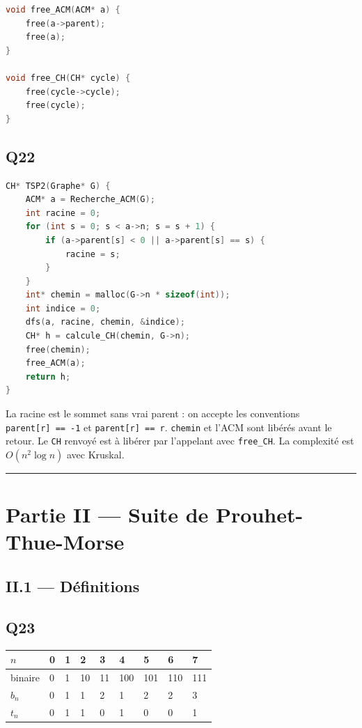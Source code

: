\documentclass[11pt,a4paper]{article}
\begin{document}
\begin{lstlisting}[language=C]
void free_ACM(ACM* a) {
    free(a->parent);
    free(a);
}

void free_CH(CH* cycle) {
    free(cycle->cycle);
    free(cycle);
}
\end{lstlisting}

\hypertarget{q22}{%
\subsection{Q22}\label{q22}}

\begin{lstlisting}[language=C]
CH* TSP2(Graphe* G) {
    ACM* a = Recherche_ACM(G);
    int racine = 0;
    for (int s = 0; s < a->n; s = s + 1) {
        if (a->parent[s] < 0 || a->parent[s] == s) {
            racine = s;
        }
    }
    int* chemin = malloc(G->n * sizeof(int));
    int indice = 0;
    dfs(a, racine, chemin, &indice);
    CH* h = calcule_CH(chemin, G->n);
    free(chemin);
    free_ACM(a);
    return h;
}
\end{lstlisting}

La racine est le sommet sans vrai parent : on accepte les conventions \texttt{parent{[}r{]}\ ==\ -1} et \texttt{parent{[}r{]}\ ==\ r}. \texttt{chemin} et l'ACM sont libérés avant le retour. Le \texttt{CH} renvoyé est à libérer par l'appelant avec \texttt{free\_CH}. La complexité est \(O(n^2\log n)\) avec Kruskal.

\begin{center}\rule{0.5\linewidth}{0.5pt}\end{center}

\hypertarget{partie-ii-suite-de-prouhet-thue-morse}{%
\section{Partie II --- Suite de Prouhet-Thue-Morse}\label{partie-ii-suite-de-prouhet-thue-morse}}

\hypertarget{ii.1-duxe9finitions}{%
\subsection{II.1 --- Définitions}\label{ii.1-duxe9finitions}}

\hypertarget{q23}{%
\subsection{Q23}\label{q23}}

\begin{longtable}[]{@{}lllllllll@{}}
\toprule\noalign{}
\(n\) & 0 & 1 & 2 & 3 & 4 & 5 & 6 & 7 \\
\midrule\noalign{}
\endhead
\bottomrule\noalign{}
\endlastfoot
binaire & 0 & 1 & 10 & 11 & 100 & 101 & 110 & 111 \\
\(b_n\) & 0 & 1 & 1 & 2 & 1 & 2 & 2 & 3 \\
\(t_n\) & 0 & 1 & 1 & 0 & 1 & 0 & 0 & 1 \\
\end{longtable}
\end{document}

